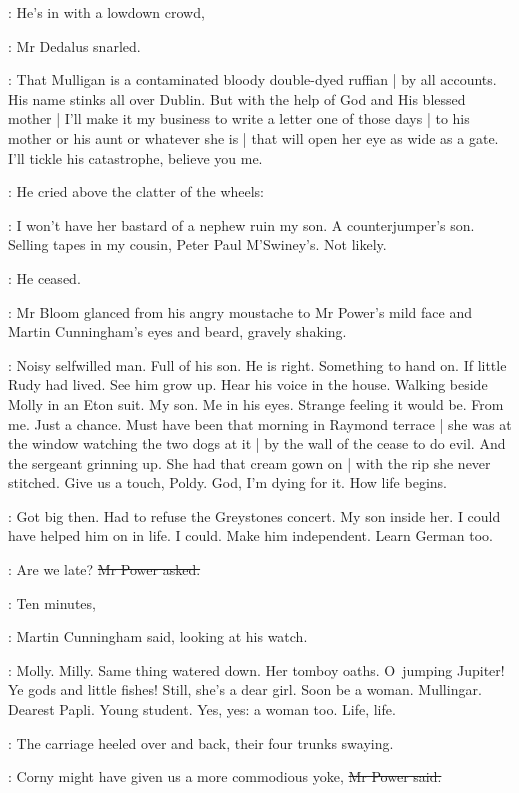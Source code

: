 \simon:
He's in with a lowdown crowd,

:
Mr Dedalus snarled.

\simon:
That Mulligan is a contaminated bloody double-dyed ruffian |
by all accounts.
His name stinks all over Dublin.
But with the help of God and His blessed mother |
I'll make it my business to write a letter
one of those days |
to his mother or his aunt or whatever she is |
that will open her eye as wide as a gate.
I'll tickle his catastrophe, believe you me.

:
He cried above the clatter of the wheels:

\simon:
I won't have her bastard of a nephew ruin my son.
A counter\-jumper's son.
Selling tapes in my cousin, Peter Paul M'Swiney's.
Not likely.

:
He ceased.

:
Mr Bloom glanced from his angry moustache
to Mr Power's mild face
and Martin Cunningham's eyes and beard,
gravely shaking.

\BloomInt:
Noisy selfwilled man.
Full of his son.
He is right.
Something to hand on.
If little Rudy had lived.
See him grow up.
Hear his voice in the house.
Walking beside Molly in an Eton suit.
My son.
Me in his eyes.
Strange feeling it would be.
From me.
Just a chance.
Must have been that morning in Raymond terrace |
she was at the window watching the two dogs at it |
by the wall of the cease to do evil.
And the sergeant grinning up.
She had that cream gown on |
with the rip she never stitched.
Give us a touch, Poldy.
God, I'm dying for it.
How life begins.

\BloomInt:
Got big then.
Had to refuse the Greystones concert.
My son inside her.
I could have helped him on in life.
I could.
Make him independent.
Learn German too.

\power:
Are we late?
\sout{Mr Power asked.}

\cunningham:
Ten minutes,

:
Martin Cunningham said, looking at his watch.

\BloomInt:
Molly.
Milly.
Same thing watered down.
Her tomboy oaths.
O~jumping Jupiter!
Ye gods and little fishes!
Still, she's a dear girl.
Soon be a woman.
Mullingar.
Dearest Papli.
Young student.
Yes, yes:
a woman too.
Life,
life.

:
The carriage heeled over and back,
their four trunks swaying.

\power:
Corny might have given us a more commodious yoke,
\sout{Mr Power said.}

